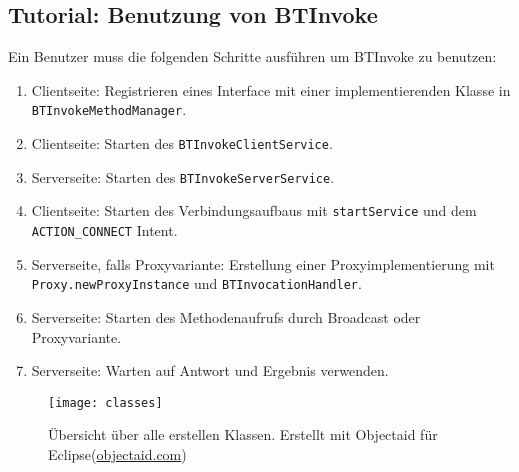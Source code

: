 \subsection{Tutorial: Benutzung von BTInvoke}
%
Ein Benutzer muss die folgenden Schritte ausführen um BTInvoke zu benutzen:
\begin{sloppypar}
\begin{enumerate}
  \item Clientseite: Registrieren eines Interface mit einer implementierenden Klasse in \lstinline{BTInvokeMethodManager}.
  \item Clientseite: Starten des \lstinline{BTInvokeClientService}.
  \item Serverseite: Starten des \lstinline{BTInvokeServerService}.
  \item Clientseite: Starten des Verbindungsaufbaus mit \lstinline{startService} und dem \lstinline{ACTION_CONNECT} Intent.
  \item Serverseite, falls Proxyvariante: Erstellung einer Proxyimplementierung mit \lstinline{Proxy.newProxyInstance} und \lstinline{BTInvocationHandler}.
  \item Serverseite: Starten des Methodenaufrufs durch Broadcast oder Proxyvariante.
  \item Serverseite: Warten auf Antwort und Ergebnis verwenden.
\end{enumerate}
\end{sloppypar}
%
\begin{sidewaysfigure}
  \texttt{[image: classes]}
  \caption{Übersicht über alle erstellen Klassen. Erstellt mit Objectaid für Eclipse(\url{objectaid.com}) }
\end{sidewaysfigure}
%